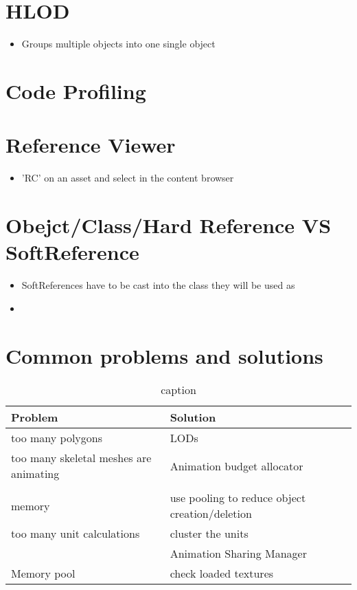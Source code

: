     \section{HLOD}
        \begin{itemize}
            \item Groups multiple objects into one single object
        \end{itemize}

    \section{Code Profiling}


    \section{Reference Viewer}
        \begin{itemize}
            \item {} 'RC' on an asset and select  in the content browser
        \end{itemize}


    \section{Obejct/Class/Hard Reference VS SoftReference}
        \begin{itemize}
            \item SoftReferences have to be cast into the class they will be used as
            \item 
        \end{itemize}


    \section{Common problems and solutions}
        \begin{table}[!htb]
            \begin{tabular}{p{5cm}|p{5cm}}
                \hline
                    Problem & Solution \\
                \hline
                too many polygons & LODs \\
                too many skeletal meshes are animating & Animation budget allocator \\
                & \\
                memory & use pooling to reduce object creation/deletion \\
                too many unit calculations & cluster the units \\
                & Animation Sharing Manager \\
                Memory pool & check loaded textures \\
                \hline
            \end{tabular}
        \caption{ caption }  
        \end{table}




